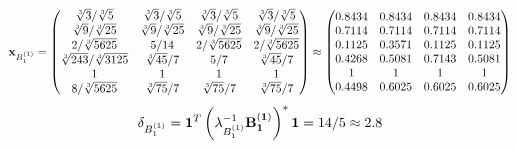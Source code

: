 \documentclass[10pt,a4paper]{article}
\begin{document}
	\[
		\bold{x}_{B_1^{(1)}} = 
		\begin{pmatrix}
			{\sqrt[3]{3}} / {\sqrt[3]{5}} & {\sqrt[3]{3}} / {\sqrt[3]{5}} & {\sqrt[3]{3}} / {\sqrt[3]{5}} & {\sqrt[3]{3}} / {\sqrt[3]{5}} \\
			{\sqrt[3]{9}} / {\sqrt[3]{25}} & {\sqrt[3]{9}} / {\sqrt[3]{25}} & {\sqrt[3]{9}} / {\sqrt[3]{25}} & {\sqrt[3]{9}} / {\sqrt[3]{25}} \\
			{{2}} / {\sqrt[3]{5625}} & {{5}} / {{14}} & {{2}} / {\sqrt[3]{5625}} & {{2}} / {\sqrt[3]{5625}} \\
			{\sqrt[3]{243}} / {\sqrt[3]{3125}} & {\sqrt[3]{45}} / {{7}} & {{5}} / {{7}} & {\sqrt[3]{45}} / {{7}} \\
			{1}{} & {1}{} & {1}{} & {1}{} \\
			{{8}} / {\sqrt[3]{5625}} & {\sqrt[3]{75}} / {{7}} & {\sqrt[3]{75}} / {{7}} & {\sqrt[3]{75}} / {{7}} \\
		\end{pmatrix}
		\approx
		\begin{pmatrix}
			0.8434   & 0.8434   & 0.8434   & 0.8434   \\
			0.7114   & 0.7114   & 0.7114   & 0.7114   \\
			0.1125   & 0.3571   & 0.1125   & 0.1125   \\
			0.4268   & 0.5081   & 0.7143   & 0.5081   \\
			1        & 1        & 1        & 1        \\
			0.4498   & 0.6025   & 0.6025   & 0.6025   \\
		\end{pmatrix}
	\]
	\[
		\delta_{B_1^{(1)}} = \bold{1}^T \left(\lambda_{B_1^{(1)}}^{-1}\bold{B_1^{(1)}}\right)^* \bold{1} = {{14}} / {{5}}\approx 2.8
	\]
\end{document}

